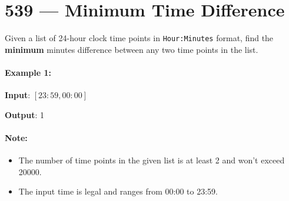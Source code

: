\section{539 --- Minimum Time Difference}
Given a list of 24-hour clock time points in \texttt{Hour:Minutes} format, find the \textbf{minimum} minutes difference between any two time points in the list.

\paragraph{Example 1:}

\begin{flushleft}
\textbf{Input}: $[23:59, 00:00]$

\textbf{Output}: 1
\end{flushleft}

\paragraph{Note:}

\begin{itemize}
\item The number of time points in the given list is at least 2 and won't exceed 20000.
\item The input time is legal and ranges from 00:00 to 23:59.
\end{itemize}
